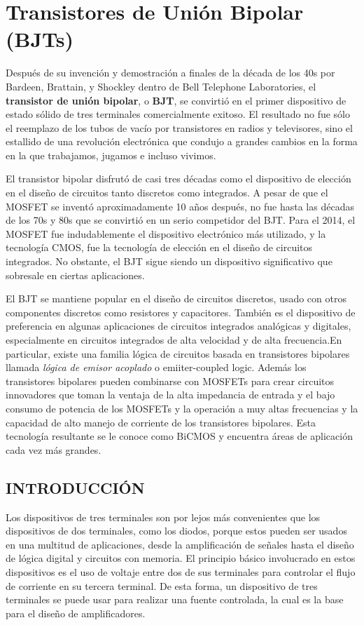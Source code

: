 \documentclass[12pt,a4paper]{book}
\begin{document}
	
	\setcounter{chapter}{0}
	
	\chapter{Transistores de Unión Bipolar (BJT\lowercase{s})}
	
	Después de su invención y demostración a finales de la década de los 40s por Bardeen, Brattain, y Shockley dentro de Bell Telephone Laboratories, el \textbf{transistor de unión bipolar}, o \textbf{BJT}, se convirtió en el primer dispositivo de estado sólido de tres terminales comercialmente exitoso. El resultado no fue sólo el reemplazo de los tubos de vacío por transistores en radios y televisores, sino el estallido de una revolución electrónica que condujo a grandes cambios en la forma en la que trabajamos, jugamos e incluso vivimos.
	
	El transistor bipolar disfrutó de casi tres décadas como el dispositivo de elección en el diseño de circuitos tanto discretos como integrados. A pesar de que el MOSFET se inventó aproximadamente 10 años después, no fue hasta las décadas de los 70s y 80s que se convirtió en un serio competidor del BJT. Para el 2014, el MOSFET fue indudablemente el dispositivo electrónico más utilizado, y la tecnología CMOS, fue la tecnología de elección en el diseño de circuitos integrados. No obstante, el BJT sigue siendo un dispositivo significativo que sobresale en ciertas aplicaciones.
	
	El BJT se mantiene popular en el diseño de circuitos discretos, usado con otros componentes discretos como resistores y capacitores. También es el dispositivo de preferencia en algunas aplicaciones de circuitos integrados analógicas y digitales, especialmente en circuitos integrados de alta velocidad y de alta frecuencia.En particular, existe una familia lógica de circuitos basada en transistores bipolares llamada \textit{lógica de emisor acoplado} o emiiter-coupled logic. Además los transistores bipolares pueden combinarse con MOSFETs para crear circuitos innovadores que toman la ventaja de la alta impedancia de entrada y el bajo consumo de potencia de los MOSFETs y la operación a muy altas frecuencias y la capacidad de alto manejo de corriente de los transistores bipolares. Esta tecnología resultante se le conoce como BiCMOS y encuentra áreas de aplicación cada vez más grandes.
	\section{INTRODUCCIÓN}
	Los dispositivos de tres terminales son por lejos más convenientes que los dispositivos de dos terminales, como los diodos, porque estos pueden ser usados en una multitud de aplicaciones, desde la amplificación de señales hasta el diseño de lógica digital y circuitos con memoria. El principio básico involucrado en estos dispositivos es el uso de voltaje entre dos de sus terminales para controlar el flujo de corriente en su tercera terminal. De esta forma, un dispositivo de tres terminales se puede usar para realizar una fuente controlada, la cual es la base para el diseño de amplificadores.
	
\end{document}
